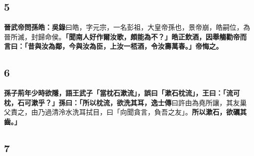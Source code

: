 \subsection*{5}

\textbf{晉武帝問孫皓：}{\footnotesize \textbf{吳錄}曰皓，字元宗，一名彭祖，大皇帝孫也，景帝崩，皓嗣位，為晉所滅，封歸命侯。}\textbf{「聞南人好作爾汝歌，頗能為不？」皓正飲酒，因舉觴勸帝而言曰：「昔與汝為鄰，今與汝為臣，上汝一桮酒，令汝壽萬春。」帝悔之。}

\subsection*{6}

\textbf{孫子荊年少時欲隱，語王武子「當枕石漱流」，誤曰「漱石枕流」，王曰：「流可枕，石可漱乎？」孫曰：「所以枕流，欲洗其耳，}{\footnotesize \textbf{逸士傳}曰許由為堯所讓，其友巢父責之，由乃過清泠水洗耳拭目，曰「向聞貪言，負吾之友」。}\textbf{所以漱石，欲礪其齒。」}

\subsection*{7}

